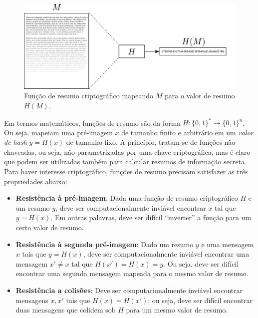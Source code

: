 \begin{figure}[htbp]
\begin{center}
    \includegraphics[scale=0.25]{figures/hash.pdf}
    \caption{Função de resumo criptográfico mapeando $M$ para o valor de resumo $H(M)$.}
    \label{fig:hash}
\end{center}
\end{figure}

Em termos matemáticos, funções de resumo são da forma $H : \{0,1\}^* \rightarrow \{0,1\}^n$. Ou seja, mapeiam uma pré-imagem $x$ de tamanho finito e arbitrário em um \emph{valor de hash} $y = H(x)$ de tamanho fixo. A princípio, tratam-se de funções não-chaveadas, ou seja, não-parametrizadas por uma chave criptográfica, mas é claro que podem ser utilizadas também para calcular resumos de informação secreta. Para haver interesse criptográfico, funções de resumo precisam satisfazer as três propriedades abaixo:

\begin{itemize}
 \item {\bf Resistência à pré-imagem}: Dada uma função de resumo criptográfico $H$ e um resumo $y$, deve ser computacionalmente inviável encontrar $x$ tal que $y = H(x)$. Em outras palavras, deve ser difícil ``inverter'' a função para um certo valor de resumo.
 \item {\bf Resistência à segunda pré-imagem}: Dado um resumo $y$ e uma mensagem $x$ tais que $y = H(x)$, deve ser computacionalmente inviável encontrar uma mensagem $x' \neq x$ tal que $H(x') = H(x) = y$. Ou seja, deve ser difícil encontrar uma segunda mensagem mapeada para o mesmo valor de resumo.
 \item {\bf Resistência a colisões}: Deve ser computacionalmente inviável encontrar mensagens $x, x'$ tais que $H(x) = H(x')$; ou seja, deve ser difícil encontrar duas mensagens que colidem sob $H$ para um mesmo valor de resumo.
\end{itemize}

